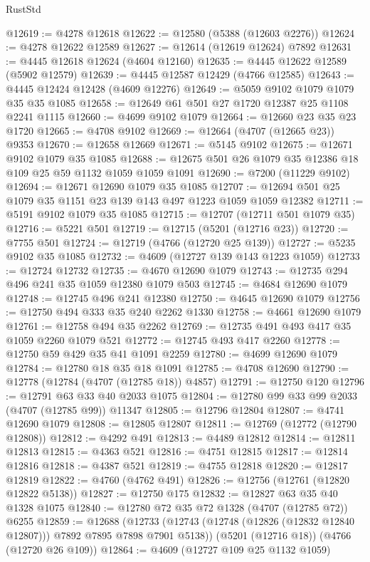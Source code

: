 \begin{lexlean}{RustStd}
\begin{coremodule}
{\begin{coremodule}
{{{{{{{{{{{{{{{{{{{{{{{{{{{{{{{{{{{@12619 := @4278 @12618
@12622 := @12580 (@5388 (@12603 @2276))
@12624 := @4278 @12622 @12589
@12627 := @12614 (@12619 @12624) @7892
@12631 := @4445 @12618 @12624 (@4604 @12160)
@12635 := @4445 @12622 @12589 (@5902 @12579)
@12639 := @4445 @12587 @12429 (@4766 @12585)
@12643 := @4445 @12424 @12428 (@4609 @12276)
@12649 := @5059 @9102 @1079 @1079 @35 @35 @1085
@12658 := @12649 @61 @501 @27 @1720 @12387 @25 @1108 @2241 @1115
@12660 := @4699 @9102 @1079
@12664 := @12660 @23 @35 @23 @1720
@12665 := @4708 @9102
@12669 := @12664 (@4707 (@12665 @23)) @9353
@12670 := @12658 @12669
@12671 := @5145 @9102
@12675 := @12671 @9102 @1079 @35 @1085
@12688 := @12675 @501 @26 @1079 @35 @12386 @18 @109 @25 @59 @1132 @1059 @1059 @1091
@12690 := @7200 (@11229 @9102)
@12694 := @12671 @12690 @1079 @35 @1085
@12707 := @12694 @501 @25 @1079 @35 @1151 @23 @139 @143 @497 @1223 @1059 @1059 @12382
@12711 := @5191 @9102 @1079 @35 @1085
@12715 := @12707 (@12711 @501 @1079 @35)
@12716 := @5221 @501
@12719 := @12715 (@5201 (@12716 @23))
@12720 := @7755 @501
@12724 := @12719 (@4766 (@12720 @25 @139))
@12727 := @5235 @9102 @35 @1085
@12732 := @4609 (@12727 @139 @143 @1223 @1059)
@12733 := @12724 @12732
@12735 := @4670 @12690 @1079
@12743 := @12735 @294 @496 @241 @35 @1059 @12380 @1079 @503
@12745 := @4684 @12690 @1079
@12748 := @12745 @496 @241 @12380
@12750 := @4645 @12690 @1079
@12756 := @12750 @494 @333 @35 @240 @2262 @1330
@12758 := @4661 @12690 @1079
@12761 := @12758 @494 @35 @2262
@12769 := @12735 @491 @493 @417 @35 @1059 @2260 @1079 @521
@12772 := @12745 @493 @417 @2260
@12778 := @12750 @59 @429 @35 @41 @1091 @2259
@12780 := @4699 @12690 @1079
@12784 := @12780 @18 @35 @18 @1091
@12785 := @4708 @12690
@12790 := @12778 (@12784 (@4707 (@12785 @18)) @4857)
@12791 := @12750 @120
@12796 := @12791 @63 @33 @40 @2033 @1075
@12804 := @12780 @99 @33 @99 @2033 (@4707 (@12785 @99)) @11347
@12805 := @12796 @12804
@12807 := @4741 @12690 @1079
@12808 := @12805 @12807
@12811 := @12769 (@12772 (@12790 @12808))
@12812 := @4292 @491
@12813 := @4489 @12812
@12814 := @12811 @12813
@12815 := @4363 @521
@12816 := @4751 @12815
@12817 := @12814 @12816
@12818 := @4387 @521
@12819 := @4755 @12818
@12820 := @12817 @12819
@12822 := @4760 (@4762 @491)
@12826 := @12756 (@12761 (@12820 @12822 @5138))
@12827 := @12750 @175
@12832 := @12827 @63 @35 @40 @1328 @1075
@12840 := @12780 @72 @35 @72 @1328 (@4707 (@12785 @72)) @6255
@12859 := @12688
    (@12733 (@12743 (@12748 (@12826 (@12832 @12840 @12807))) @7892 @7895 @7898 @7901 @5138))
    (@5201 (@12716 @18))
    (@4766 (@12720 @26 @109))
@12864 := @4609 (@12727 @109 @25 @1132 @1059)
}}}}}}}}}}}}}}}}}}}}}}}}}}}}}}}}}}}
\end{coremodule}}
\end{coremodule}
\end{lexlean}
